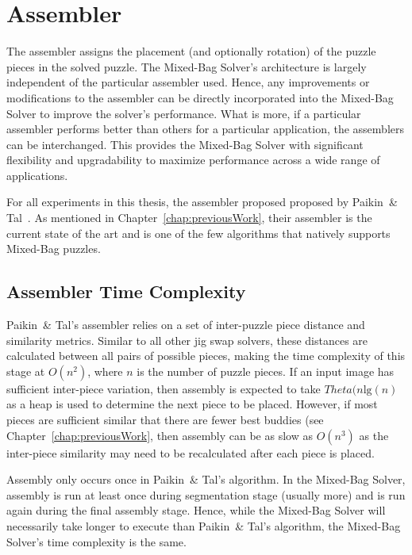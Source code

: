 \section{Assembler}\label{sec:SolverAssembler}

The assembler assigns the placement (and optionally rotation) of the puzzle pieces in the solved puzzle.  The Mixed-Bag Solver's architecture is largely independent of the particular assembler used.  Hence, any improvements or modifications to the assembler can be directly incorporated into the Mixed-Bag Solver to improve the solver's performance.  What is more, if a particular assembler performs better than others for a particular application, the assemblers can be interchanged.  This provides the Mixed-Bag Solver with significant flexibility and upgradability to maximize performance across a wide range of applications.

For all experiments in this thesis, the assembler proposed proposed by Paikin~\& Tal~\cite{paikin2015}.  As mentioned in Chapter~\ref{chap:previousWork}, their assembler is the current state of the art and is one of the few algorithms that natively supports Mixed-Bag puzzles.

\subsection{Assembler Time Complexity}

Paikin~\& Tal's assembler relies on a set of inter-puzzle piece distance and similarity metrics.  Similar to all other jig swap solvers, these distances are calculated between all pairs of possible pieces, making the time complexity of this stage at $O(n^2)$, where $n$ is the number of puzzle pieces.  If an input image has sufficient inter-piece variation, then assembly is expected to take $Theta(n \text{lg}(n)$ as a heap is used to determine the next piece to be placed.  However, if most pieces are sufficient similar that there are fewer best buddies (see Chapter~\ref{chap:previousWork}, then assembly can be as slow as $O(n^3)$ as the inter-piece similarity may need to be recalculated after each piece is placed.

Assembly only occurs once in Paikin~\& Tal's algorithm.  In the Mixed-Bag Solver, assembly is run at least once during segmentation stage (usually more) and is run again during the final assembly stage.  Hence, while the Mixed-Bag Solver will necessarily take longer to execute than Paikin~\& Tal's algorithm, the Mixed-Bag Solver's time complexity is the same.

